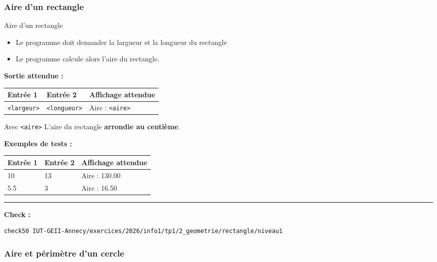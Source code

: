 \subsubsection{Aire d'un rectangle}
\begin{UPSTIcahierDesCharges}{Aire d'un rectangle}
	\begin{itemize}
		\item Le programme doit demander la largueur et la longueur du rectangle
		\item Le programme calcule alors l'aire du rectangle.
	\end{itemize}
	\textbf{Sortie attendue :}
	\begin{center}
		\begin{tabular}{|l|l|l|}
			\hline
			Entrée 1           & Entrée 2            & Affichage attendue     \\
			\hline
			\texttt{<largeur>} & \texttt{<longueur>} & Aire : \texttt{<aire>} \\
			\hline
		\end{tabular}
	\end{center}
	Avec \texttt{<aire>} L'aire du rectangle \textbf{arrondie au centième}.

	\textbf{Exemples de tests :}
	\begin{center}
		\begin{tabular}{|l|l|l|}
			\hline
			Entrée 1 & Entrée 2 & Affichage attendue \\
			\hline
			10       & 13       & Aire : 130.00      \\
			5.5      & 3        & Aire : 16.50       \\
			\hline
		\end{tabular}
	\end{center}
	\hrule
	\textbf{Check :}
	\begin{lstlisting}[language=bash,style=console]
check50 IUT-GEII-Annecy/exercices/2026/info1/tp1/2_geometrie/rectangle/niveau1
\end{lstlisting}
\end{UPSTIcahierDesCharges}





\subsubsection{Aire et périmètre d'un cercle}

